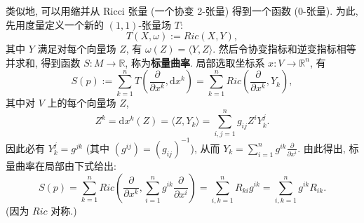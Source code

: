 类似地, 可以用缩并从 Ricci 张量 (一个协变 2-张量) 得到一个函数 (0-张量). 为此, 先用度量定义一个新的 $(1,1)$-张量场 $T$:
\[
  T(X,\omega):=\mathit{Ric}(X,Y),
\]
其中 $Y$ 满足对每个向量场 $Z$, 有 $\omega(Z)=\langle Y,Z\rangle$. 然后令协变指标和逆变指标相等并求和, 得到函数 $S:M\to\mathbb{R}$, 称为\textbf{标量曲率}. 局部选取坐标系 $x:V\to\mathbb{R}^n$, 有
\[
  S(p):=\sum_{k=1}^nT\left(\frac{\partial}{\partial x^k},\mathrm{d}x^k\right)
  =\sum_{k=1}^n\mathit{Ric}\left(\frac{\partial}{\partial x^k},Y_k\right),
\]
其中对 $V$ 上的每个向量场 $Z$,
\[
  Z^k=\mathrm{d}x^k(Z)=\langle Z,Y_k\rangle=\sum_{i,j=1}^n g_{ij}Z^iY_k^j.
\]
因此必有 $Y_k^j=g^{jk}$ (其中 $(g^{ij})=(g_{ij})^{-1}$), 从而 $Y_k=\sum_{i=1}^ng^{ik}\frac{\partial}{\partial x^i}$. 由此得出, 标量曲率在局部由下式给出:
\[
  S(p)=\sum_{k=1}^n\mathit{Ric}\left(\frac{\partial}{\partial x^k},
  \sum_{i=1}^ng^{ik}\frac{\partial}{\partial x^i}\right)
  =\sum_{i,k=1}^nR_{ki}g^{ik}=\sum_{i,k=1}^n g^{ik}R_{ik}.
\]
(因为 $\mathit{Ric}$ 对称.)

